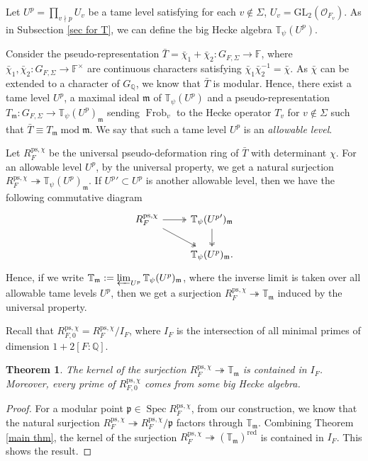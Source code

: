 \documentclass[a4paper, 12pt]{amsart}
\newtheorem{thm}{Theorem}[subsection]
\DeclareMathOperator{\modd}{mod}
\DeclareMathOperator{\Spec}{Spec}
\DeclareMathOperator{\Frob}{Frob}
\def\ps{\mathrm{ps}}
\newcommand{\F}{\mathbb{F}}
\newcommand{\Q}{\mathbb{Q}}
\newcommand{\T}{\mathbb{T}}
\newcommand{\GL}{\mathrm{GL}}
\newcommand{\cO}{\mathcal{O}}
\newcommand{\kp}{\mathfrak{p}}
\newcommand{\km}{\mathfrak{m}}
\begin{document}
    Let $U^p = \prod_{v \nmid p} U_v$ be a tame level satisfying for each $v \notin \Sigma$, $U_v = \GL_2(\cO_{F_v})$. As in Subsection \ref{sec for T}, we can define the big Hecke algebra $\T_{\psi}(U^p)$. 
    
    Consider the pseudo-representation $\bar{T} = \bar{\chi}_1 + \bar{\chi}_2 : G_{F, \Sigma} \to \F$, where $\bar{\chi}_1, \bar{\chi}_2 : G_{F, \Sigma} \to \F^\times$ are continuous characters satisfying $\bar{\chi}_1\bar{\chi}_2^{-1}=\bar{\chi}$. As $\bar{\chi}$ can be extended to a character of $G_\Q$, we know that $\bar{T}$ is modular. Hence, there exist a tame level $U^p$, a maximal ideal $\km$ of $\T_{\psi}(U^p)$ and a pseudo-representation $T_\km : G_{F, \Sigma} \to \T_{\psi}(U^p)_\km$ sending $\Frob_v$ to the Hecke operator $T_v$ for $v \notin \Sigma$ such that $ \bar{T} \equiv T_\km \modd \km$. We say that such a tame level $U^p$ is an \textit{allowable level}.
    
    Let $R_F^{\ps, \chi}$ be the universal pseudo-deformation ring of $\bar{T}$ with determinant $\chi$. For an allowable level $U^p$, by the universal property, we get a natural surjection $ R_F^{\ps, \chi} \twoheadrightarrow \T_{\psi}(U^p)_\km$. If ${U^p}' \subset U^p$ is another allowable level, then we have the following commutative diagram
    \[\begin{tikzcd}
    	R_F^{\ps, \chi} \arrow[r, two heads] \arrow[rd, two heads] & \T_{\psi}({U^p}')_\km \arrow[d, two heads]\\
      ~ &	\T_{\psi}(U^p)_\km.
    \end{tikzcd}\]
    Hence, if we write $\T_{\km} := \varprojlim_{U^p} \T_{\psi}(U^p)_\km$, where the inverse limit is taken over all allowable tame levels $U^p$, then we get a surjection $ R_F^{\ps, \chi} \twoheadrightarrow \T_{\km}$ induced by the universal property.
    
    Recall that $R_{F, 0}^{\ps, \chi} = R_F^{\ps, \chi}/I_F$, where $I_F$ is the intersection of all minimal primes of dimension $1+2[F:\Q]$. 
    
    \begin{thm}\label{big R=T quaternion}
    	The kernel of the surjection $ R_F^{\ps, \chi} \twoheadrightarrow \T_{\km}$ is contained in $I_F$. Moreover, every prime of $R_{F, 0}^{\ps, \chi}$ comes from some big Hecke algebra.
    \end{thm}
    
    \begin{proof}
    	For a modular point $\kp \in \Spec R_{F}^{\ps, \chi}$, from our construction, we know that the natural surjection $ R_{F}^{\ps, \chi} \twoheadrightarrow R_{F}^{\ps, \chi}/\kp$ factors through $ \T_{\km} $. Combining Theorem \ref{main thm}, the kernel of the surjection $ R_{F}^{\ps, \chi} \twoheadrightarrow ( \T_{\km})^{\operatorname{red}}$ is contained in $I_F$. This shows the result.
    \end{proof}
    
\end{document}
